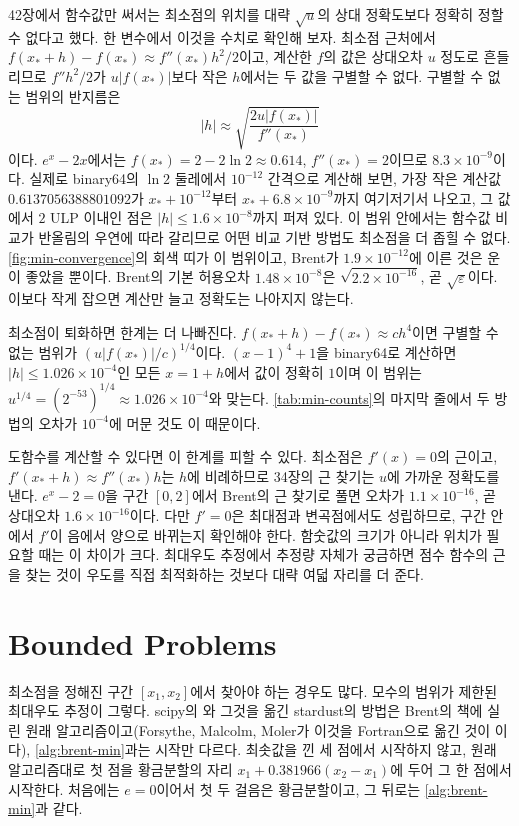 42장에서 함수값만 써서는 최소점의 위치를 대략 $\sqrt u$의 상대 정확도보다 정확히 정할 수 없다고 했다. 한 변수에서 이것을 수치로 확인해 보자. 최소점 근처에서 $f(x_\ast+h)-f(x_\ast)\approx f''(x_\ast)h^2/2$이고, 계산한 $f$의 값은 상대오차 $u$ 정도로 흔들리므로 $f''h^2/2$가 $u|f(x_\ast)|$보다 작은 $h$에서는 두 값을 구별할 수 없다. 구별할 수 없는 범위의 반지름은
\[
|h|\approx\sqrt{\frac{2u|f(x_\ast)|}{f''(x_\ast)}}
\]
이다. $e^x-2x$에서는 $f(x_\ast)=2-2\ln2\approx0.614$, $f''(x_\ast)=2$이므로 $8.3\times10^{-9}$이다. 실제로 binary64의 $\ln2$ 둘레에서 $10^{-12}$ 간격으로 계산해 보면, 가장 작은 계산값 $0.6137056388801092$가 $x_\ast+10^{-12}$부터 $x_\ast+6.8\times10^{-9}$까지 여기저기서 나오고, 그 값에서 $2$ ULP 이내인 점은 $|h|\le1.6\times10^{-8}$까지 퍼져 있다. 이 범위 안에서는 함수값 비교가 반올림의 우연에 따라 갈리므로 어떤 비교 기반 방법도 최소점을 더 좁힐 수 없다. \cref{fig:min-convergence}의 회색 띠가 이 범위이고, Brent가 $1.9\times10^{-12}$에 이른 것은 운이 좋았을 뿐이다. Brent의 기본 허용오차 $1.48\times10^{-8}$은 $\sqrt{2.2\times10^{-16}}$, 곧 $\sqrt\varepsilon$이다. 이보다 작게 잡으면 계산만 늘고 정확도는 나아지지 않는다.

최소점이 퇴화하면 한계는 더 나빠진다. $f(x_\ast+h)-f(x_\ast)\approx ch^4$이면 구별할 수 없는 범위가 $(u|f(x_\ast)|/c)^{1/4}$이다. $(x-1)^4+1$을 binary64로 계산하면 $|h|\le1.026\times10^{-4}$인 모든 $x=1+h$에서 값이 정확히 $1$이며 이 범위는 $u^{1/4}=(2^{-53})^{1/4}\approx1.026\times10^{-4}$와 맞는다. \cref{tab:min-counts}의 마지막 줄에서 두 방법의 오차가 $10^{-4}$에 머문 것도 이 때문이다.

도함수를 계산할 수 있다면 이 한계를 피할 수 있다. 최소점은 $f'(x)=0$의 근이고, $f'(x_\ast+h)\approx f''(x_\ast)h$는 $h$에 비례하므로 34장의 근 찾기는 $u$에 가까운 정확도를 낸다. $e^x-2=0$을 구간 $[0,2]$에서 Brent의 근 찾기로 풀면 오차가 $1.1\times10^{-16}$, 곧 상대오차 $1.6\times10^{-16}$이다. 다만 $f'=0$은 최대점과 변곡점에서도 성립하므로, 구간 안에서 $f'$이 음에서 양으로 바뀌는지 확인해야 한다. 함숫값의 크기가 아니라 위치가 필요할 때는 이 차이가 크다. 최대우도 추정에서 추정량 자체가 궁금하면 점수 함수의 근을 찾는 것이 우도를 직접 최적화하는 것보다 대략 여덟 자리를 더 준다.

\section{Bounded Problems}
\label{sec:bounded}

최소점을 정해진 구간 $[x_1,x_2]$에서 찾아야 하는 경우도 많다. 모수의 범위가 제한된 최대우도 추정이 그렇다. scipy의 와 그것을 옮긴 stardust의  방법은 Brent의 책에 실린 원래 알고리즘이고(Forsythe, Malcolm, Moler가 이것을 Fortran으로 옮긴 것이 이다), \cref{alg:brent-min}과는 시작만 다르다\cite{brent1973,forsythe1977}. 최솟값을 낀 세 점에서 시작하지 않고, 원래 알고리즘대로 첫 점을 황금분할의 자리 $x_1+0.381966(x_2-x_1)$에 두어 그 한 점에서 시작한다. 처음에는 $e=0$이어서 첫 두 걸음은 황금분할이고, 그 뒤로는 \cref{alg:brent-min}과 같다.

